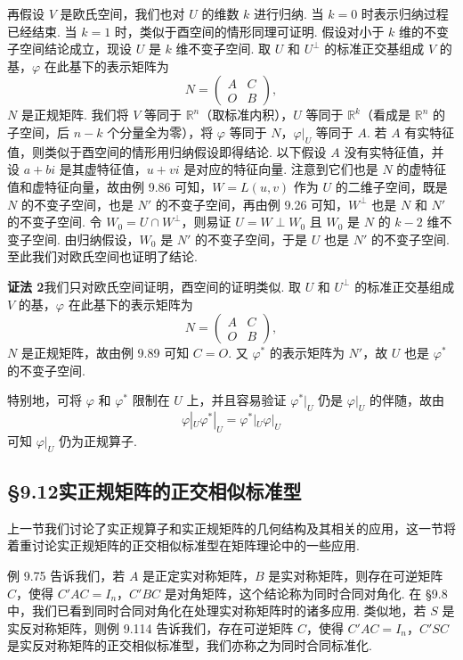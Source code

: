 \documentclass[UTF8,12pt,a4paper,fontset=fandol]{ctexart}
\begin{document}
再假设 $V$ 是欧氏空间，我们也对 $U$ 的维数 $k$ 进行归纳. 当 $k=0$ 时表示归纳过程已经结束. 当 $k=1$ 时，类似于酉空间的情形同理可证明. 假设对小于 $k$ 维的不变子空间结论成立，现设 $U$ 是 $k$ 维不变子空间. 取 $U$ 和 $U^\perp$ 的标准正交基组成 $V$ 的基，$\varphi$ 在此基下的表示矩阵为
\[
N=\begin{pmatrix}
A&C\\
O&B
\end{pmatrix},
\]
$N$ 是正规矩阵. 我们将 $V$ 等同于 $\mathbb{R}^n$（取标准内积），$U$ 等同于 $\mathbb{R}^k$（看成是 $\mathbb{R}^n$ 的子空间，后 $n-k$ 个分量全为零），将 $\varphi$ 等同于 $N$，$\varphi|_U$ 等同于 $A$. 若 $A$ 有实特征值，则类似于酉空间的情形用归纳假设即得结论. 以下假设 $A$ 没有实特征值，并设 $a+bi$ 是其虚特征值，$u+vi$ 是对应的特征向量. 注意到它们也是 $N$ 的虚特征值和虚特征向量，故由例 9.86 可知，$W=L(u,v)$ 作为 $U$ 的二维子空间，既是 $N$ 的不变子空间，也是 $N'$ 的不变子空间，再由例 9.26 可知，$W^\perp$ 也是 $N$ 和 $N'$ 的不变子空间. 令 $W_0=U\cap W^\perp$，则易证 $U=W\perp W_0$ 且 $W_0$ 是 $N$ 的 $k-2$ 维不变子空间. 由归纳假设，$W_0$ 是 $N'$ 的不变子空间，于是 $U$ 也是 $N'$ 的不变子空间. 至此我们对欧氏空间也证明了结论.

\noindent\textbf{证法 2}\quad 我们只对欧氏空间证明，酉空间的证明类似. 取 $U$ 和 $U^\perp$ 的标准正交基组成 $V$ 的基，$\varphi$ 在此基下的表示矩阵为
\[
N=\begin{pmatrix}
A&C\\
O&B
\end{pmatrix},
\]
$N$ 是正规矩阵，故由例 9.89 可知 $C=O$. 又 $\varphi^*$ 的表示矩阵为 $N'$，故 $U$ 也是 $\varphi^*$ 的不变子空间.

特别地，可将 $\varphi$ 和 $\varphi^*$ 限制在 $U$ 上，并且容易验证 $\varphi^*|_U$ 仍是 $\varphi|_U$ 的伴随，故由
\[
\varphi|_U\varphi^*|_U=\varphi^*|_U\varphi|_U
\]
可知 $\varphi|_U$ 仍为正规算子.

\subsection*{§9.12\quad 实正规矩阵的正交相似标准型}

上一节我们讨论了实正规算子和实正规矩阵的几何结构及其相关的应用，这一节将着重讨论实正规矩阵的正交相似标准型在矩阵理论中的一些应用.

例 9.75 告诉我们，若 $A$ 是正定实对称矩阵，$B$ 是实对称矩阵，则存在可逆矩阵 $C$，使得 $C'AC=I_n$，$C'BC$ 是对角矩阵，这个结论称为同时合同对角化. 在 §9.8 中，我们已看到同时合同对角化在处理实对称矩阵时的诸多应用. 类似地，若 $S$ 是实反对称矩阵，则例 9.114 告诉我们，存在可逆矩阵 $C$，使得 $C'AC=I_n$，$C'SC$ 是实反对称矩阵的正交相似标准型，我们亦称之为同时合同标准化.
\end{document}
